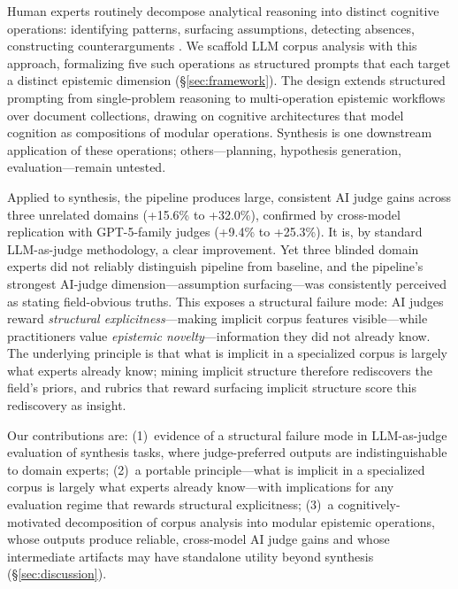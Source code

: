 \documentclass{article}
\begin{document}
Human experts routinely decompose analytical reasoning into distinct cognitive operations: identifying patterns, surfacing assumptions, detecting absences, constructing counterarguments \citep{polya1945solve,sternberg1985componential,newell1972human}. We scaffold LLM corpus analysis with this approach, formalizing five such operations as structured prompts that each target a distinct epistemic dimension (\S\ref{sec:framework}). The design extends structured prompting \citep{wei2022chain,zhou2023leasttomost,khot2023decomposed} from single-problem reasoning to multi-operation epistemic workflows over document collections, drawing on cognitive architectures \citep{anderson2004integrated} that model cognition as compositions of modular operations. Synthesis is one downstream application of these operations; others---planning, hypothesis generation, evaluation---remain untested.

Applied to synthesis, the pipeline produces large, consistent AI judge gains across three unrelated domains (+15.6\% to +32.0\%), confirmed by cross-model replication with GPT-5-family judges (+9.4\% to +25.3\%). It is, by standard LLM-as-judge methodology, a clear improvement. Yet three blinded domain experts did not reliably distinguish pipeline from baseline, and the pipeline's strongest AI-judge dimension---assumption surfacing---was consistently perceived as stating field-obvious truths. This exposes a structural failure mode: AI judges reward \textit{structural explicitness}---making implicit corpus features visible---while practitioners value \textit{epistemic novelty}---information they did not already know. The underlying principle is that what is implicit in a specialized corpus is largely what experts already know; mining implicit structure therefore rediscovers the field's priors, and rubrics that reward surfacing implicit structure score this rediscovery as insight.

Our contributions are: (1)~evidence of a structural failure mode in LLM-as-judge evaluation of synthesis tasks, where judge-preferred outputs are indistinguishable to domain experts; (2)~a portable principle---what is implicit in a specialized corpus is largely what experts already know---with implications for any evaluation regime that rewards structural explicitness; (3)~a cognitively-motivated decomposition of corpus analysis into modular epistemic operations, whose outputs produce reliable, cross-model AI judge gains and whose intermediate artifacts may have standalone utility beyond synthesis (\S\ref{sec:discussion}).
\end{document}
